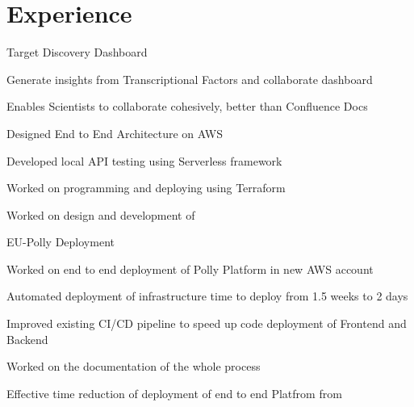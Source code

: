 \documentclass[]{single-page-resume}
\begin{document}
\begin{minipage}[t]{0.66\textwidth} 


\section{Experience}

\vspace{\topsep} %
Target Discovery Dashboard 
\vspace{\topsep} %
\begin{tightemize}
   \item Generate insights from Transcriptional Factors and collaborate dashboard
   \item Enables Scientists to collaborate cohesively, better than Confluence Docs
    \item Designed End to End   Architecture on AWS
    \item Developed local API testing using Serverless framework
    \item Worked on programming and deploying  using Terraform
    \item Worked on design and development of  
\end{tightemize}
\vspace{\topsep} %
EU-Polly Deployment
\begin{tightemize}
   \item Worked on end to end deployment of Polly Platform in new AWS account
   \item Automated deployment of infrastructure  time to deploy from 1.5 weeks to 2 days
    \item Improved existing CI/CD pipeline to speed up code deployment of Frontend and Backend
    \item Worked on the documentation of the whole process
    \item Effective time reduction of deployment of end to end Platfrom from 
\end{tightemize}

\end{minipage}
\end{document}
